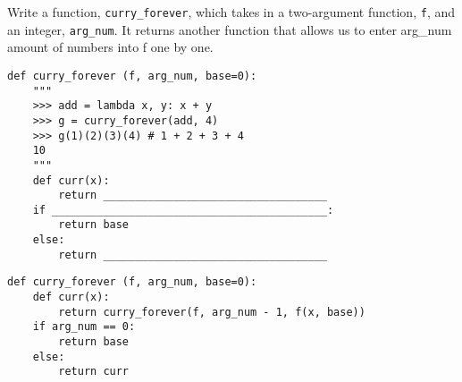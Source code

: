 \begin{blocksection}
\question Write a function, \texttt{curry\_forever}, which takes in a two-argument function, \texttt{f}, and an integer, \texttt{arg\_num}. It returns another function that allows us to enter arg\_num amount of numbers into f one by one.

\begin{lstlisting}
def curry_forever (f, arg_num, base=0):
    """
    >>> add = lambda x, y: x + y
    >>> g = curry_forever(add, 4)
    >>> g(1)(2)(3)(4) # 1 + 2 + 3 + 4
    10 
    """
    def curr(x):
        return ___________________________________
    if ___________________________________________:
        return base
    else:
        return ___________________________________
\end{lstlisting}

\begin{solution}
\begin{lstlisting}
def curry_forever (f, arg_num, base=0):
    def curr(x):
        return curry_forever(f, arg_num - 1, f(x, base))
    if arg_num == 0:
        return base
    else:
        return curr

\end{lstlisting}
\end{solution}
\end{blocksection}

